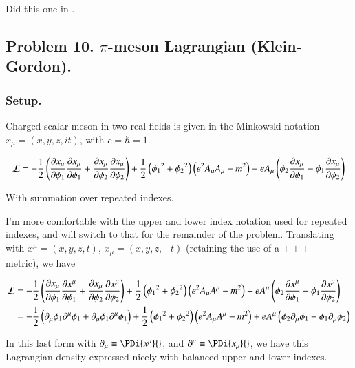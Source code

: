 \documentclass{article}
\begin{document}
Did this one in \cite{PJgoldch1}.

\subsection{ Problem 10.  $\pi$-meson Lagrangian (Klein-Gordon). }

\subsubsection{ Setup. }

Charged scalar meson in two real fields is given in the Minkowski notation $x_\mu = (x,y,z,it)$, with $c = \hbar = 1$.

\begin{align}
\mathcal{L} = -\frac{1}{2}\left( 
\frac{\partial{x_\mu}}{\partial {\phi_1}} \frac{\partial{x_\mu}}{\partial {\phi_1}} 
+ \frac{\partial{x_\mu}}{\partial {\phi_2}} \frac{\partial{x_\mu}}{\partial {\phi_2}} 
\right)
+ \frac{1}{2}
\left( 
{\phi_1}^2 
+ {\phi_2}^2 
\right)
\left( e^2 A_\mu A_\mu - m^2 \right) 
+ e A_\mu \left(
\phi_2 \frac{\partial{x_\mu}}{\partial {\phi_1}}
-\phi_1 \frac{\partial{x_\mu}}{\partial {\phi_2}}
\right)
\end{align}

With summation over repeated indexes.

I'm more comfortable with the upper and lower index notation used for repeated indexes, and will switch to that for the remainder
of the problem.  Translating with $x^\mu = (x,y,z,t)$, $x_\mu = (x,y,z,-t)$ (retaining the use of a $+++-$ metric), we have

\begin{align}
\mathcal{L} 
&= -\frac{1}{2}\left( 
\frac{\partial{x_\mu}}{\partial {\phi_1}} \frac{\partial{x^\mu}}{\partial {\phi_1}} 
+ \frac{\partial{x_\mu}}{\partial {\phi_2}} \frac{\partial{x^\mu}}{\partial {\phi_2}} 
\right)
+ \frac{1}{2}
\left( 
{\phi_1}^2 
+ {\phi_2}^2 
\right)
\left( e^2 A_\mu A^\mu - m^2 \right) 
+ e A^\mu \left(
\phi_2 \frac{\partial{x^\mu}}{\partial {\phi_1}}
-\phi_1 \frac{\partial{x^\mu}}{\partial {\phi_2}}
\right) \\
&= -\frac{1}{2}\left( 
\partial_\mu \phi_1 \partial^\mu \phi_1
+\partial_\mu \phi_1 \partial^\mu \phi_1
\right)
+ \frac{1}{2}
\left( 
{\phi_1}^2 
+ {\phi_2}^2 
\right)
\left( e^2 A_\mu A^\mu - m^2 \right) 
+ e A^\mu \left(
\phi_2 \partial_\mu {\phi_1}
-\phi_1 \partial_\mu {\phi_2}
\right) 
\end{align}

In this last form with $\partial_\mu \equiv \PDi{x^\mu}{}$, and $\partial^\mu \equiv \PDi{x_\mu}{}$, we have this Lagrangian density expressed nicely with
balanced upper and lower indexes.

%
\end{document}

